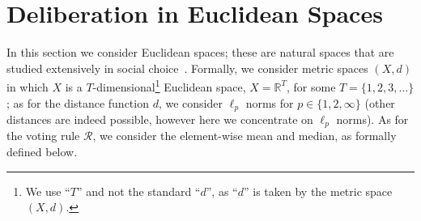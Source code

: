 \documentclass[runningheads,envcountsame]{llncs}
\DeclareMathOperator*{\argmin}{arg\,min}
\begin{document}
\iffalse
\begin{proof}
%
We show that in all iterations, the winner stays the same, and therefore, by Theorem~\ref{theorem:one}, convergence follows.
Let $w$ denote the winner for some iteration $V$, so $w$ has the minimum sum of distances from the agents in that iteration - $w=\argmin_{x \in X} \sum_{v \in V} d(v, x)$. In the next iteration $V'$, suppose that some element $y$ is the winner - $y=\argmin_{x \in X} \sum_{v \in V'} d(v, x)$
%
Note that every agent got closer to $w$ by $\epsilon$, unless it was already less than $\epsilon$-far away from $w$, in which case it moved to $w$. We denote by $V_1$
the group of agents that were $\epsilon$ or more far away from $w$, and $V_2=V-V_1$. So, the new sum of distances from $w$ is $d_w=\sum_{v \in V'} d(v, w) = \sum_{v \in V_1}(d(v, w) - \epsilon) + \sum_{v \in V_2} d(v, w) - \sum_{v \in V_2} (v, w)$ where we replaced $V_1'$ by $V_1$ by reducing $\epsilon$, and just added and subtracted all elements in $V_2$. $d_w = \sum_{v in V} d(v, w) - n\epsilon - \sum_{v \in V_2} d(v, w)$, where we joined $V_1$ and $V_2$ into $V$.
$d_x=\sum_{v \in V'} d(v, x)$. But by the triangle inequality, for $v' \in V'$ and the corresponding $v \in V$, $d(x, v') + d(v, v') \geq d(x, v)$, and by Constraint~\ref{constraint:two} $d(v, v') \leq \epsilon$, so $d(x, v') \geq d(x, v) - \epsilon$.
Replacing that in the first equation, $d_x \geq \sum_{v \in V} (d(v, x) - \epsilon)=\sum_{v \in V} d(v, x) - n\epsilon$.
If we combine the two values, we get $d_x\geq d_w$, because the first sum is just the sum of distances in iteration $V$, where $w$ was the argmin. Thus, $x = w$ and the claim follows by Theorem~\ref{theorem:one}.
\qed\end{proof}
\fi

\section{Deliberation in Euclidean Spaces}\label{section:euclid}

In this section we consider Euclidean spaces; these are natural spaces that are studied extensively in social choice~\cite{arrow1990advances}.
%
Formally, we consider metric spaces $(X, d)$ in which $X$ is a $T$-dimensional\footnote{We use ``$T$'' and not the standard ``$d$'', as ``$d$'' is taken by the metric space $(X, d)$.} Euclidean space, $X = \mathbb{R}^T$, for some $T = \{1, 2, 3, \ldots\}$; as for the distance function $d$, we consider $\ell_p$ norms for $p \in \{1, 2, \infty\}$ (other distances are indeed possible, however here we concentrate on $\ell_p$ norms).
%
As for the voting rule $\mathcal{R}$, we consider the element-wise mean and median, as formally defined below.
\end{document}
